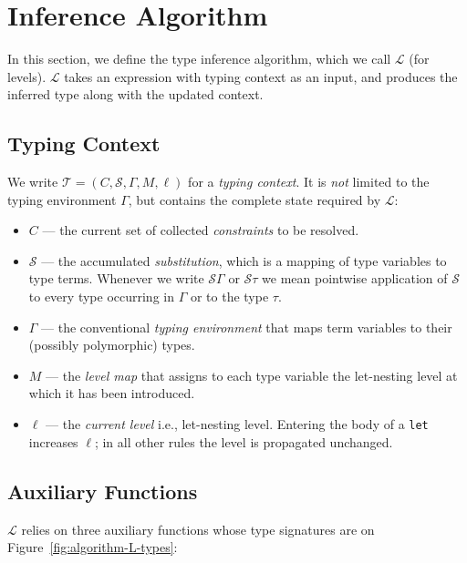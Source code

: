 \section{Inference Algorithm}

In this section, we define the type inference algorithm, which we call $\mathcal{L}$ (for levels). $\mathcal{L}$ takes an expression with typing context as an input, and produces the inferred type along with the updated context.

\subsection{Typing Context}

We write $\mathcal{T} = (C, \mathcal{S}, \Gamma, M, \ell)$ for a \emph{typing context}. It is \emph{not} limited to the typing environment \(\Gamma\), but contains the complete state required by $\mathcal{L}$:
\begin{itemize}
  \item $C$ — the current set of collected \emph{constraints} to be resolved.
  \item $\mathcal{S}$ — the accumulated \emph{substitution}, which is a mapping of type variables to type terms.  Whenever we write $\mathcal{S}\Gamma$ or $\mathcal{S}\tau$ we mean pointwise application of $\mathcal{S}$ to every type occurring in $\Gamma$ or to the type $\tau$.
  \item $\Gamma$ — the conventional \emph{typing environment} that maps term variables to their (possibly polymorphic) types.
  \item $M$ — the \emph{level map} that assigns to each type variable the let-nesting level at which it has been introduced.
  \item $\ell$ — the \emph{current level} i.e., let-nesting level. Entering the body of a \texttt{let} increases $\ell$; in all other rules the level is propagated unchanged.
\end{itemize}

\subsection{Auxiliary Functions}

$\mathcal{L}$ relies on three auxiliary functions whose type signatures are on Figure~\ref{fig:algorithm-L-types}:

